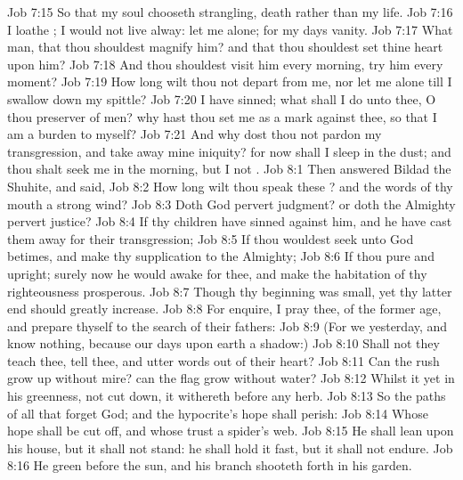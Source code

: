 \vs Job 7:15 So that my soul chooseth strangling,  death rather than my life.
\vs Job 7:16 I loathe ; I would not live alway: let me alone; for my days  vanity.
\vs Job 7:17 What  man, that thou shouldest magnify him? and that thou shouldest set thine heart upon him?
\vs Job 7:18 And  thou shouldest visit him every morning,  try him every moment?
\vs Job 7:19 How long wilt thou not depart from me, nor let me alone till I swallow down my spittle?
\vs Job 7:20 I have sinned; what shall I do unto thee, O thou preserver of men? why hast thou set me as a mark against thee, so that I am a burden to myself?
\vs Job 7:21 And why dost thou not pardon my transgression, and take away mine iniquity? for now shall I sleep in the dust; and thou shalt seek me in the morning, but I  not .
\vs Job 8:1 Then answered Bildad the Shuhite, and said,
\vs Job 8:2 How long wilt thou speak these ? and  the words of thy mouth  a strong wind?
\vs Job 8:3 Doth God pervert judgment? or doth the Almighty pervert justice?
\vs Job 8:4 If thy children have sinned against him, and he have cast them away for their transgression;
\vs Job 8:5 If thou wouldest seek unto God betimes, and make thy supplication to the Almighty;
\vs Job 8:6 If thou  pure and upright; surely now he would awake for thee, and make the habitation of thy righteousness prosperous.
\vs Job 8:7 Though thy beginning was small, yet thy latter end should greatly increase.
\vs Job 8:8 For enquire, I pray thee, of the former age, and prepare thyself to the search of their fathers:
\vs Job 8:9 (For we  yesterday, and know nothing, because our days upon earth  a shadow:)
\vs Job 8:10 Shall not they teach thee,  tell thee, and utter words out of their heart?
\vs Job 8:11 Can the rush grow up without mire? can the flag grow without water?
\vs Job 8:12 Whilst it  yet in his greenness,  not cut down, it withereth before any  herb.
\vs Job 8:13 So  the paths of all that forget God; and the hypocrite's hope shall perish:
\vs Job 8:14 Whose hope shall be cut off, and whose trust  a spider's web.
\vs Job 8:15 He shall lean upon his house, but it shall not stand: he shall hold it fast, but it shall not endure.
\vs Job 8:16 He  green before the sun, and his branch shooteth forth in his garden.

